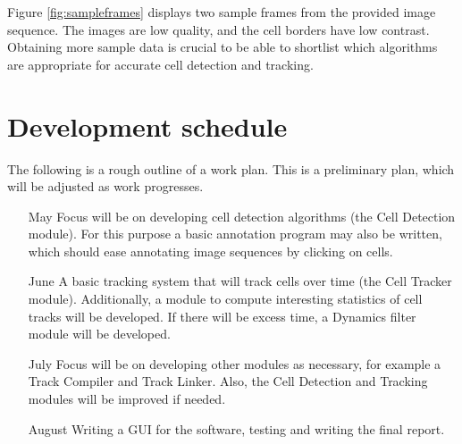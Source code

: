 \documentclass[12pt,a4paper,openany]{book}
\begin{document}
Figure \ref{fig:sampleframes} displays two sample frames from the provided image sequence. The images are low quality, and the cell borders have low contrast. Obtaining more sample data is crucial to be able to shortlist which algorithms are appropriate for accurate cell detection and tracking.

\section{Development schedule}

The following is a rough outline of a work plan. This is a preliminary plan, which will be adjusted as work progresses.

\begin{enumerate}
  \item [May] Focus will be on developing cell detection algorithms (the Cell Detection module). For this purpose a basic annotation program may also be written, which should ease annotating image sequences by clicking on cells.
  \item [June] A basic tracking system that will track cells over time (the Cell Tracker module). Additionally, a module to compute interesting statistics of cell tracks will be developed. If there will be excess time, a Dynamics filter module will be developed.
  \item[July] Focus will be on developing other modules as necessary, for example a Track Compiler and Track Linker. Also, the Cell Detection and Tracking modules will be improved if needed.
  \item [August] Writing a GUI for the software, testing and writing the final report.
\end{enumerate}


\newpage


\label{page_bibliography}
 
\end{document}

